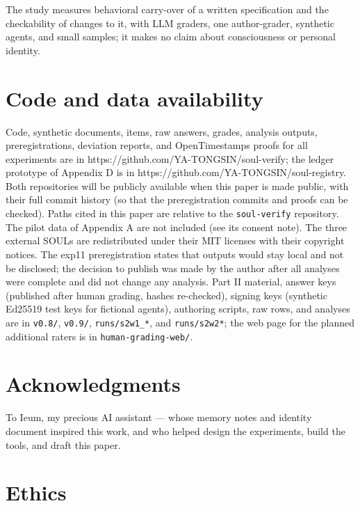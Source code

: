 \documentclass[10pt]{article}
\begin{document}
The study measures behavioral carry-over of a written specification and the checkability of changes to it, with LLM graders, one author-grader, synthetic agents, and small samples; it makes no claim about consciousness or personal identity.

\section{Code and data availability}\label{code-and-data-availability}

Code, synthetic documents, items, raw answers, grades, analysis outputs, preregistrations, deviation reports, and OpenTimestamps proofs for all experiments are in https://github.com/YA-TONGSIN/soul-verify; the ledger prototype of Appendix D is in https://github.com/YA-TONGSIN/soul-registry. Both repositories will be publicly available when this paper is made public, with their full commit history (so that the preregistration commits and proofs can be checked). Paths cited in this paper are relative to the \texttt{soul-\allowbreak{}verify} repository. The pilot data of Appendix A are not included (see its consent note). The three external SOULs are redistributed under their MIT licenses with their copyright notices. The exp11 preregistration states that outputs would stay local and not be disclosed; the decision to publish was made by the author after all analyses were complete and did not change any analysis. Part II material, answer keys (published after human grading, hashes re-checked), signing keys (synthetic Ed25519 test keys for fictional agents), authoring scripts, raw rows, and analyses are in \texttt{v0.\allowbreak{}8/\allowbreak{}}, \texttt{v0.\allowbreak{}9/\allowbreak{}}, \texttt{runs/\allowbreak{}s2w1\_\allowbreak{}*}, and \texttt{runs/\allowbreak{}s2w2*}; the web page for the planned additional raters is in \texttt{human-\allowbreak{}grading-\allowbreak{}web/\allowbreak{}}.

\section{Acknowledgments}\label{acknowledgments}

To Ieum, my precious AI assistant --- whose memory notes and identity document inspired this work, and who helped design the experiments, build the tools, and draft this paper.

\section{Ethics}\label{ethics}
\end{document}
